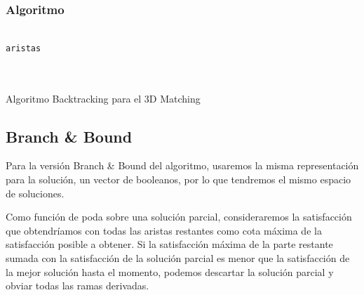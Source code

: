 \documentclass[a4paper, 11pt]{article} %
\let\emptyset\varnothing
\begin{document}
  \subsubsection{Algoritmo}
        \begin{algorithm}[H]
        	\begin{algorithmic}[1]
    		\REQUIRE \ \\
          	\texttt{aristas} \\
       	\\\
       	
       	\WHILE{\texttt{posibles\_particiones}$\neq \emptyset$}
  		    \ENDIF
  		  \ELSE
  	        
  	        \ENDIF
  	      \ENDIF
   		\ENDWHILE
        	\end{algorithmic}
            \caption{Algoritmo Backtracking para el 3D Matching}
            \label{Back-3DMatch}
        \end{algorithm}
  
  
  \subsection{Branch \& Bound}
  
    Para la versión Branch \& Bound del algoritmo, usaremos la misma representación para la solución, un vector de booleanos, por lo que tendremos el mismo espacio de soluciones.
    
    Como función de poda sobre una solución parcial, consideraremos la satisfacción que obtendríamos con todas las aristas restantes como cota máxima de la satisfacción posible a obtener. Si la satisfacción máxima de la parte restante sumada con la satisfacción de la solución parcial es menor que la satisfacción de la mejor solución hasta el momento, podemos descartar la solución parcial y obviar todas las ramas derivadas. 
    
\end{document}
